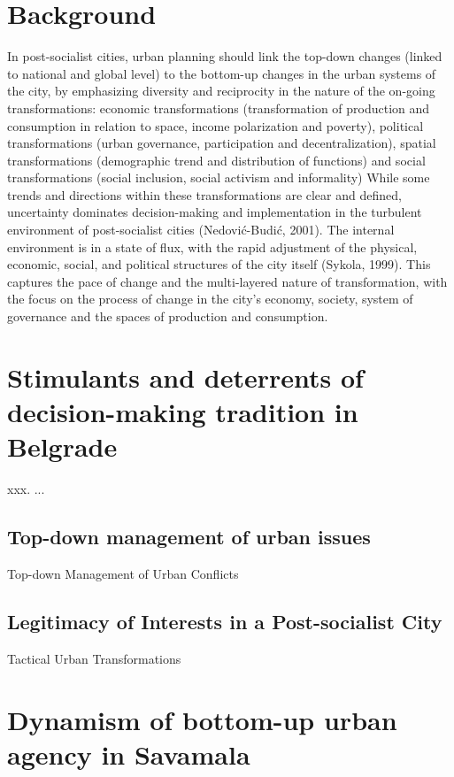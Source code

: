 \documentclass[11pt]{report}
\begin{document}
\section{Background}
In post-socialist cities, urban planning should link the top-down changes (linked to national and global level) to the bottom-up changes in the urban systems of the city, by emphasizing diversity and reciprocity in the nature of the on-going transformations: economic transformations (transformation of production and consumption in relation to space, income polarization and poverty), political transformations (urban governance, participation and decentralization), spatial transformations (demographic trend and distribution of functions) and social transformations (social inclusion, social activism and informality)
While some trends and directions within these transformations are clear and defined, uncertainty dominates decision-making and implementation in the turbulent environment of post-socialist cities (Nedović-Budić, 2001). The internal environment is in a state of flux, with the rapid adjustment of the physical, economic, social, and political structures of the city itself (Sykola, 1999). This captures the pace of change and the multi-layered nature of transformation, with the focus on the process of change in the city’s economy, society, system of governance and the spaces of production and consumption.

\section{Stimulants and deterrents of decision-making tradition in Belgrade}

xxx. ...

\subsection{Top-down management of urban issues}

Top-down Management of Urban Conflicts

\subsection{Legitimacy of Interests in a Post-socialist City}

Tactical Urban Transformations 

\section{Dynamism of bottom-up urban agency in Savamala}
\end{document}
